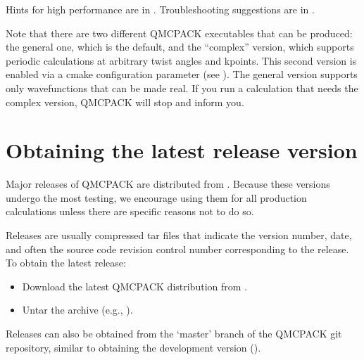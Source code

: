 \documentclass[letterpaper,10pt,english]{sphinxmanual}
\begin{document}
Hints for high performance are in
{\hyperref[\detokenize{installation:buildperformance}]{}}.
Troubleshooting suggestions are in
{\hyperref[\detokenize{installation:troubleshoot}]{}}.

Note that there are two different QMCPACK executables that can be
produced: the general one, which is the default, and the “complex”
version, which supports periodic calculations at arbitrary twist angles
and k\sphinxhyphen{}points. This second version is enabled via a cmake configuration
parameter (see {\hyperref[\detokenize{installation:cmakeoptions}]{}}).
The general version supports only wavefunctions that can be made real.
If you run a calculation that needs the complex version, QMCPACK will
stop and inform you.


\section{Obtaining the latest release version}
\label{\detokenize{installation:obtaining-the-latest-release-version}}\label{\detokenize{installation:obrelease}}
Major releases of QMCPACK are distributed from .
Because these versions undergo the most testing, we encourage using them
for all production calculations unless there are specific reasons not to
do so.

Releases are usually compressed tar files that indicate the version
number, date, and often the source code revision control number
corresponding to the release. To obtain the latest release:
\begin{itemize}
\item {} 
Download the latest QMCPACK distribution from .

\item {} 
Untar the archive (e.g., ).

\end{itemize}

Releases can also be obtained from the ‘master’ branch of the QMCPACK
git repository, similar to obtaining the development version
({\hyperref[\detokenize{installation:obdevelopment}]{}}).
\end{document}
